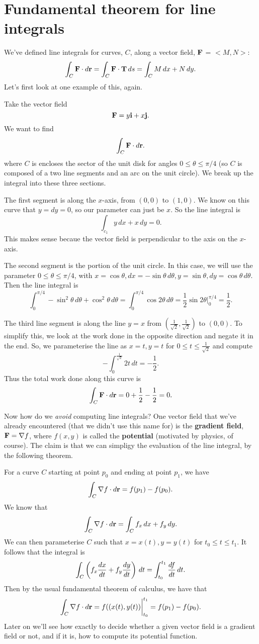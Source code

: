 \section{Fundamental theorem for line integrals}

We've defined line integrals for curves, $C$, along a vector field, $\boldsymbol{\mathbf{F}}$ = $<M,N>$:
\[ \int_C \boldsymbol{\mathbf{F}} \cdot d\boldsymbol{\mathbf{r}} = \int_C \boldsymbol{\mathbf{F}} \cdot \boldsymbol{\mathbf{T}}\,ds = \int_C M\,dx + N\,dy. \]
Let's first look at one example of this, again.

\bex
Take the vector field
\[ \boldsymbol{\mathbf{F}} = y\boldsymbol{\mathbf{i}} + x\boldsymbol{\mathbf{j}}. \]
We want to find 
\[ \int_C \boldsymbol{\mathbf{F}} \cdot d\boldsymbol{\mathbf{r}}. \]
where $C$ is encloses the sector of the unit disk for angles $0 \le \theta \le \pi/4$ (so $C$ is composed of a two line segments and an arc on the unit circle). We break up the integral into these three sections.
\ben
\item The first segment is along the $x$-axis, from $(0,0)$ to $(1,0)$. We know on this curve that $y=dy=0$, so our parameter can just be $x$. So the line integral is
\[ \int_{c_1} y\,dx+x\,dy = 0. \]
This makes sense becaue the vector field is perpendicular to the axis on the $x$-axis. 
\item The second segment is the portion of the unit circle.  In this case, we will use the parameter $0\le\theta\le\pi/4$, with $x=\cos\theta,dx=-\sin\theta\,d\theta,y=\sin\theta,dy=\cos\theta\,d\theta$. Then the line integral is
\[ \int_0^{\pi/4} -\sin^2 \theta\,d\theta + \cos^2\theta\,d\theta = \int_0^{\pi/4} \cos 2\theta \,d\theta = \frac12 \sin 2 \theta \bigg|_0^{\pi/4}=\frac12. \]
\item The third line segment is along the line $y=x$ from $(\frac1{\sqrt{2}}, \frac1{\sqrt{2}})$ to $(0,0)$. To simplify this, we look at the work done in the opposite direction and negate it in the end. So, we parameterise the line as $x=t,y=t$ for $0\le t\le \frac1{\sqrt{2}}$ and compute
\[ -\int_0^{\frac1{\sqrt{2}}} 2t\,dt = -\frac 12. \]
\een
Thus the total work done along this curve is
\[ \int_C \boldsymbol{\mathbf{F}} \cdot d\boldsymbol{\mathbf{r}} = 0 + \frac 12 -\frac 12 = 0. \] 
\eex

Now how do we \textit{avoid} computing line integrals? One vector field that we've already encountered (that we didn't use this name for) is the \textbf{gradient field}, $\boldsymbol{\mathbf{F}} = \nabla f$, where $f(x,y)$ is called the \textbf{potential} (motivated by physics, of course). The claim is that we can simpligy the evaluation of the line integral, by the following theorem.
 
For a curve $C$ starting at point $p_0$ and ending at point $p_1$, we have
\[ \int_C \nabla f \cdot d\boldsymbol{\mathbf{r}} = f(p_1) - f(p_0). \]
\bpf
We know that
\[ \int_C \nabla f\cdot d\boldsymbol{\mathbf{r}} = \int_C f_x\,dx +f_y\,dy. \]
We can then parameterise $C$ such that $x=x(t),y=y(t)$ for $t_0 \le t \le t_1$. It follows that the integral is
\[ \int_C \left(f_x \frac{dx}{dt} + f_y \frac{dy}{dt}\right)\,dt = \int_{t_0}^{t_1} \frac{df}{dt}\,dt. \]
Then by the usual fundamental theorem of calculus, we have that
\[ \int_C \nabla f \cdot d\boldsymbol{\mathbf{r}} = f((x(t),y(t))\bigg|_{t_0}^{t_1} = f(p_1) - f(p_0). \]
\epf
\etm
Later on we'll see how exactly to decide whether a given vector field is a gradient field or not, and if it is, how to compute its potential function.

